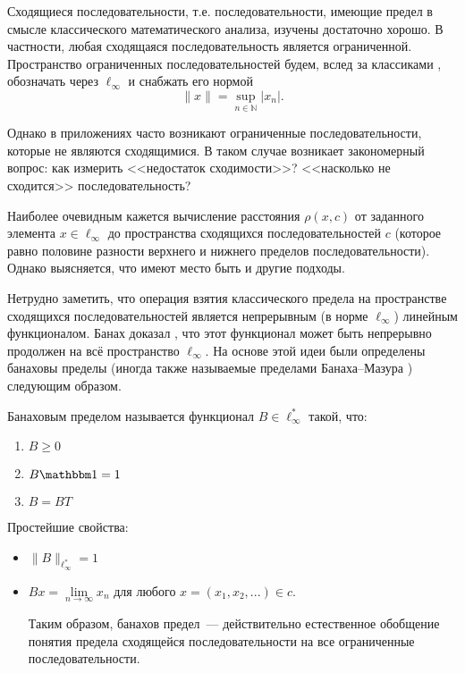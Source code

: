 Сходящиеся последовательности, т.е. последовательности, имеющие предел в смысле классического математического анализа,
изучены достаточно хорошо.
В частности, любая сходящаяся последовательность является ограниченной.
Пространство ограниченных последовательностей будем, вслед за классиками \cite{wojtaszczyk1996banach,lindenstrauss1973classical},
обозначать через $\ell_\infty$ и снабжать его нормой
\begin{equation*}
	\|x\| = \sup_{n\in\mathbb{N}}|x_n|
	.
\end{equation*}

Однако в приложениях часто возникают ограниченные последовательности,
которые не являются сходящимися.
В таком случае возникает закономерный вопрос:
как измерить <<недостаток сходимости>>?
<<насколько не сходится>> последовательность?

Наиболее очевидным кажется вычисление расстояния $\rho(x,c)$ от заданного элемента $x\in\ell_\infty$
до пространства сходящихся последовательностей $c$
(которое равно половине разности верхнего и нижнего пределов последовательности).
Однако выясняется, что имеют место быть и другие подходы.

Нетрудно заметить, что операция взятия классического предела на пространстве сходящихся последовательностей
является непрерывным (в норме $\ell_\infty$) линейным функционалом.
Банах доказал \cite{banach1993theorie}, что этот функционал может быть непрерывно продолжен на всё пространство $\ell_\infty$.
На основе этой идеи были определены банаховы пределы
(иногда также называемые пределами Банаха--Мазура \cite{alekhno2012superposition,alekhno2015banach})
следующим образом.

Банаховым пределом называется функционал $B\in \ell_\infty^*$ такой, что:
\begin{enumerate}
	\item
		$B \geqslant 0$
	\item
		$B\one = 1$
	\item
		$B=BT$
\end{enumerate}

Простейшие свойства:
\begin{itemize}
	\item
		$\|B\|_{\ell_\infty^*} = 1$
	\item
		$Bx = \lim\limits_{n\to\infty} x_n$ для любого $x=(x_1, x_2, ...) \in c$.

		Таким образом,
		банахов предел~--- действительно естественное обобщение понятия предела сходящейся последовательности
		на все ограниченные последовательности.
\end{itemize}

